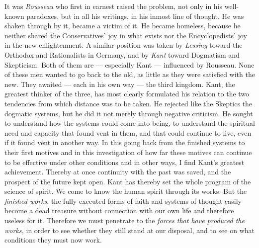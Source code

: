 \documentclass[12pt,a4paper,openany]{book}
\newcommand{\opage}[1]{\marginnote{\footnotesize\textit{[#1]}}}
\begin{document}
It was \emph{Rousseau} who first in earnest raised the problem,
not only in his well-known paradoxes, but in all his writings,
in his inmost line of thought. He was shaken through by it, became
a victim of it. He became homeless, because he neither shared
\opage{233}the Conservatives' joy in what exists nor
the Encyclopedists' joy in the new enlightenment. A similar
position was taken by \emph{Lessing} toward the Orthodox and Rationalists
in Germany, and by \emph{Kant} toward Dogmatism and Skepticism.
Both of them are --- especially Kant --- influenced by Rousseau.
None of these men wanted to go back to the old, as little as
they were satisfied with the new. They awaited --- each in his own
way --- the third kingdom. Kant, the greatest thinker of the
three, has most clearly formulated his relation to the two tendencies
from which distance was to be taken. He rejected
like the Skeptics the dogmatic systems, but he did
it not merely through negative criticism. He sought to understand
how the systems could come into being, to understand the spiritual
need and capacity that found vent in them, and that could continue
to live, even if it found vent in another way. In this
going back from the finished systems to their first motives
and in this investigation of how far these motives can
continue to be effective under other conditions and in other ways,
I find Kant's greatest achievement. Thereby at once
continuity with the past was saved, and the prospect of the future
kept open. Kant has thereby set the whole
program of the science of spirit. We come to know the human spirit through
its works. But the \emph{finished works}, the fully executed
forms of faith and systems of thought easily become a dead treasure without
connection with our own life and therefore useless for
it. Therefore we must penetrate to the \emph{forces that have
produced the works,} in order to see whether they still stand at our
disposal, and to see on what conditions they must now
work.
\end{document}
